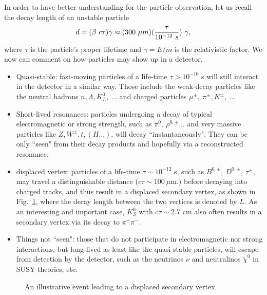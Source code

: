 \documentclass[12pt,prd,aps,floats,preprintnumbers,preprint,superscriptaddress,floatfix,nofootinbib]{revtex4}
\begin{document}
In order to have  better understanding for the particle observation, 
let us recall the decay length of an unstable particle
\begin{equation}
d=(\beta\ c \tau)\gamma \approx (300\ \mu m) ({\tau\over 10^{-12}\ s})\ \gamma,
\end{equation}
where $\tau$ is the particle's proper  lifetime and $\gamma=E/m$ is the relativistic factor. 
We now can comment on how particles may show up in a detector.
\begin{itemize}
\item
Quasi-stable:  fast-moving particles of a life-time $\tau > 10^{-10}$ s
will still interact in the detector in a similar way. 
Those include the weak-decay particles like the neutral hadrons 
$n,\Lambda,K^0_L,\ ... $ and charged particles $ \mu^\pm,\ \pi^\pm, K^\pm,\ ...$
\item Short-lived resonances: particles undergoing a decay of  typical  
electromagnetic or strong strength, such as $\pi^{0},\ \rho^{0,\pm}$... and
very massive particles like 
$Z,W^\pm,t, (H ...)$, will decay ``instantaneously". They can be only ``seen"
from their decay products and hopefully via a reconstructed resonance.
\item
displaced vertex:  particles of a life-time $\tau \sim 10^{-12}$ s, such as
$B^{0,\pm},\ D^{0,\pm},\ \tau^\pm,$ may travel a distinguishable distance
($c\tau \sim 100\ \mu$m.)
before decaying into charged tracks, and thus result in a displaced
secondary vertex, as shown in Fig.~\ref{fig:vertex}, where the
decay length between the two vertices is denoted by $L$.
As an interesting and important case, $K_S^0$ with $c\tau \sim 2.7$ cm
also often results in a secondary vertex via its decay to $\pi^+\pi^-$.
\item
Things not ``seen":  those that do not participate in electromagnetic nor
strong interactions, but long-lived as least like the quasi-stable particles,
will escape from detection by the detector, such as the neutrinos $\nu$
and neutralinos $\tilde\chi^0$ in SUSY theories, etc.
\end{itemize}

\begin{center}
\begin{figure}[tb]
\caption{An illustrative event leading to a displaced secondary vertex.
\label{fig:vertex}}
\end{figure}
\end{center}
\end{document}
